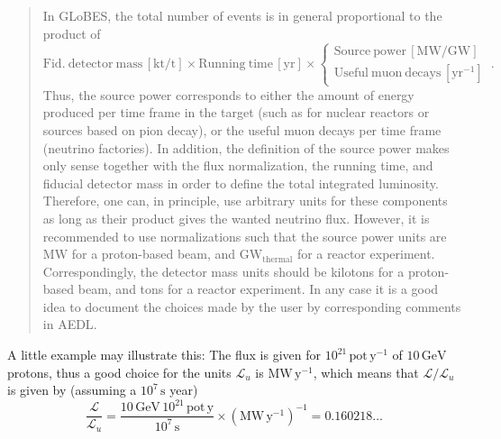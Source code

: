 \documentclass[12pt]{article}
\newcommand{\GLOBES}{{\sf GLoBES}}
\newcommand{\AEDL}{{\sf AEDL}}
\begin{document}
\begin{quote}
 In \GLOBES , the total number of events is in general proportional to the product of
\begin{equation}
\mathrm{Fid.~detector~mass}\,\left[\mathrm{kt/t}\right]\times 
\mathrm{Running~time} \,\left[\mathrm{yr}\right]\times\left\{ \begin{array}{c}
\mathrm{Source~power}\,\left[\mathrm{MW/GW}\right]\\
\mathrm{Useful~muon~decays}\,\left[\mathrm{yr}^{-1}\right]
\end{array}\right.\,.
\end{equation}
Thus, the source power corresponds to either the amount of energy produced per time frame in the target (such as for nuclear reactors or sources based on pion decay), or the useful muon decays per time frame (neutrino factories). In addition, the definition of the source power makes only sense together with the flux normalization, the running time, and fiducial detector mass in order to define the total integrated luminosity. Therefore, one can, in principle, use arbitrary units for these components as long as their product gives the wanted neutrino flux. However, it is
recommended to use normalizations such that the source power units are $\mathrm{MW}$ for a proton-based beam, and $\mathrm{GW}_\mathrm{thermal}$ for a reactor experiment. Correspondingly, the detector mass units should be kilotons for a proton-based beam, and tons for a reactor experiment. In any case it is a good
idea to document the choices made by the user by corresponding comments
in \AEDL.
\end{quote}

A little example may illustrate this:
The flux is given for $10^{21}\, \mathrm{pot}\,\mathrm{y}^{-1}$ of
$10\,\mathrm{GeV}$ protons, thus a good choice for the units $\mathcal{L}_u$
is $\mathrm{MW}\,\mathrm{y}^{-1}$, which means that
$\mathcal{L}/\mathcal{L}_u$ is given by (assuming a $10^7\,\mathrm{s}$
year)
\begin{equation}
\frac{\mathcal{L}}{\mathcal{L}_u}=\frac{10\,\mathrm{GeV}\,10^{21}\,\mathrm{pot}\,\mathrm{y}}{10^7\,\mathrm{s}}\times(\mathrm{MW}\,\mathrm{y}^{-1})^{-1}=0.160218\ldots
\end{equation}



\end{document}
